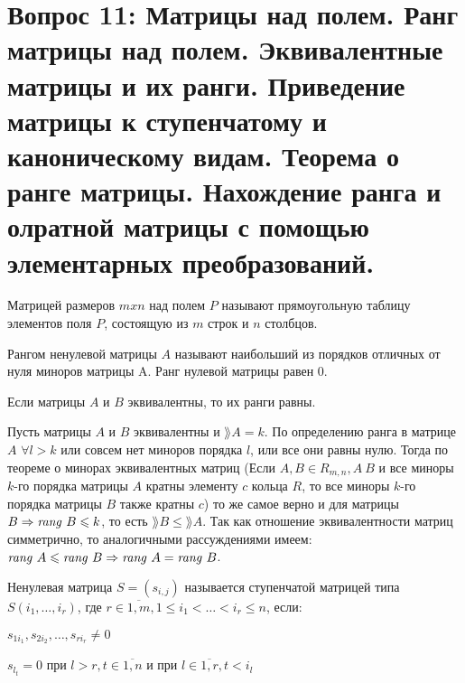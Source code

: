 \section{Вопрос 11: Матрицы над полем. Ранг матрицы над полем.
Эквивалентные матрицы и их ранги.
Приведение матрицы к ступенчатому и каноническому видам.
Теорема о ранге матрицы.
Нахождение ранга и олратной матрицы с помощью элементарных преобразований.}


\begin{defs}
  Матрицей размеров $mxn$ над полем $P$ называют прямоугольную таблицу
  элементов поля $P$, состоящую из $m$ строк и $n$ столбцов.
\end{defs}

\begin{defs}
  Рангом ненулевой матрицы  $A$ называют
  наибольший из порядков отличных от нуля миноров матрицы A.
  Ранг нулевой матрицы равен 0.
\end{defs}

\begin{proofs}
	Если матрицы $A$ и $B$ эквивалентны, то их ранги равны.
	\begin{dokvo}
    Пусть матрицы $A$ и $B$ эквивалентны и $\rang{A} = k$.
    По определению ранга в матрице $A$ $\forall l > k$ или совсем нет миноров порядка $l$, или все они равны нулю.
    Тогда по теореме о минорах эквивалентных матриц (Если $A,B \in R_{m,n}, A~B$ и все миноры $k$-го порядка матрицы $A$ кратны элементу $c$
    кольца $R$, то все миноры $k$-го порядка матрицы $B$ также кратны $c$) то же самое верно и для матрицы $B \Rightarrow \mathit{rang} \ B \leqslant k$, то есть $\rang{B} \leqslant \rang{A}$.
    Так как отношение эквивалентности матриц симметрично, то аналогичными рассуждениями имеем: $\mathit{rang} \ A \leqslant \mathit{rang} \ B \Rightarrow \mathit{rang} \ A = \mathit{rang} \ B$.
	\end{dokvo}
\end{proofs}

\begin{defs}
  Ненулевая матрица $S=(s_{i,j})$ называется ступенчатой матрицей типа $S(i_1, \ldots, i_r)$,
  где $r \in \overline{1,m}, 1 \leqslant i_1 < \ldots < i_r \leqslant n$, если:
  \begin{enumerate*}
  	\item $s_{1i_1}, s_{2i_2}, \ldots, s_{ri_r} \neq 0$
  	\item $s_{l_t} = 0$ при $l > r, t \in \overline{1,n}$ и при $l \in \overline{1,r}, t < i_l$
  \end{enumerate*}
\end{defs}

